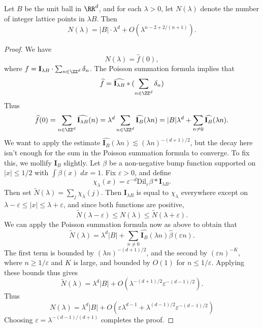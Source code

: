 \begin{theorem}
    Let $B$ be the unit ball in $\RR^d$, and for each $\lambda > 0$, let $N(\lambda)$ denote the number of integer lattice points in $\lambda B$. Then
    \[ N(\lambda) = |B| \cdot \lambda^d + O(\lambda^{n-2 + 2/(n+1)}). \]
\end{theorem}
\begin{proof}
    We have
    \[ N(\lambda) = \widehat{f}(0), \]
    where $f = \mathbf{I}_{\lambda B} \cdot \sum_{n \in \ZZ^d} \delta_n$. The Poisson summation formula implies that
    \[ \widehat{f} = \widehat{\mathbf{I}_{\lambda B}} * (\sum_{n \in \ZZ^d} \delta_n) \]
    Thus
    \[ \widehat{f}(0) = \sum_{n \in \ZZ^d} \widehat{\mathbf{I}_{\lambda B}}(n) = \lambda^d \sum_{n \in \ZZ^d} \widehat{\mathbf{I}_B}(\lambda n) = |B| \lambda^d + \sum_{n \neq 0} \widehat{\mathbf{I}_B}(\lambda n). \]
    We want to apply the estimate $\widehat{\mathbf{I}_B}(\lambda n) \lesssim (\lambda n)^{-(d+1)/2}$, but the decay here isn't enough for the sum in the Poisson summation formula to converge. To fix this, we mollify $\mathbf{I}_B$ slightly. Let $\beta$ be a non-negative bump function supported on $|x| \leq 1/2$ with $\int \beta(x)\; dx = 1$. Fix $\varepsilon > 0$, and define
    \[ \chi_\lambda(x) = \varepsilon^{-d} \text{Dil}_\varepsilon \beta * \mathbf{I}_{\lambda B}. \]
    Then set $\widetilde{N}(\lambda) = \sum_j \chi_\lambda(j)$. Then $\mathbf{I}_{\lambda B}$ is equal to $\chi_\lambda$ everywhere except on $\lambda - \varepsilon \leq |x| \leq \lambda + \varepsilon$, and since both functions are positive,
    \[ \widetilde{N}(\lambda - \varepsilon) \leq N(\lambda) \leq \widetilde{N}(\lambda + \varepsilon). \]
    We can apply the Poisson summation formula now as above to obtain that
    \[ \widetilde{N}(\lambda) = \lambda^d |B| + \sum_{n \neq 0} \widehat{\mathbf{I}_B}(\lambda n) \widehat{\beta}(\varepsilon n). \]
    The first term is bounded by $(\lambda n)^{-(d+1)/2}$, and the second by $(\varepsilon n)^{-K}$, where $n \geq 1/\varepsilon$ and $K$ is large, and bounded by $O(1)$ for $n \leq 1/\varepsilon$. Applying these bounds thus gives
    \[ \widetilde{N}(\lambda) = \lambda^d |B| + O( \lambda^{-(d+1)/2} \varepsilon^{-(d-1)/2} ). \]
    Thus
    \[ N(\lambda) = \lambda^d |B| + O( \varepsilon \lambda^{d-1} + \lambda^{(d-1)/2} \varepsilon^{-(d-1)/2} ) \]
    Choosing $\varepsilon = \lambda^{-(d-1)/(d+1)}$ completes the proof.
\end{proof}

